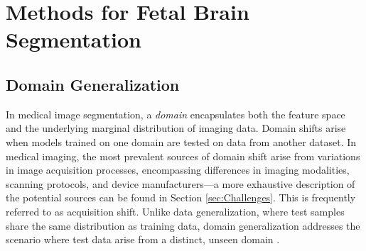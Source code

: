 \chapter{Methods for Fetal Brain Segmentation} \label{chap:MethodsForFetalBrainSegmentation}
\vspace{1cm}



\section{Domain Generalization}
In medical image segmentation, a \emph{domain} encapsulates both the feature space and the underlying marginal distribution of imaging data. Domain shifts arise when models trained on one domain are tested on data from another dataset. In medical imaging, the most prevalent sources of domain shift arise from variations in image acquisition processes, encompassing differences in imaging modalities, scanning protocols, and device manufacturers---a more exhaustive description of the potential sources can be found in Section \ref{sec:Challenges}. This is frequently referred to as acquisition shift. Unlike data generalization, where test samples share the same distribution as training data, domain generalization addresses the scenario where test data arise from a distinct, unseen domain \cite{Ouyang2023}.

